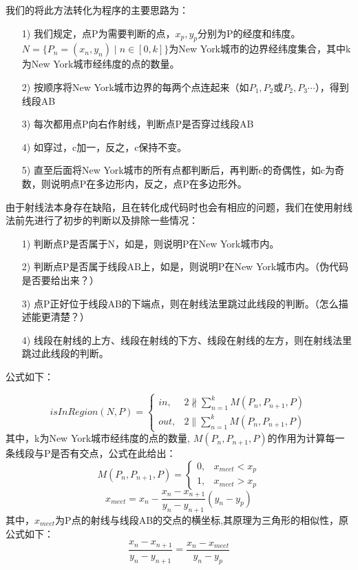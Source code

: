 我们的将此方法转化为程序的主要思路为：
\begin{itemize}
  \item [1)]
我们规定，点P为需要判断的点，$ x_p, y_p $分别为P的经度和纬度。$ N=\{P_n=(x_n,y_n)\mid n \in [0, k]\} $为New York城市的边界经纬度集合，其中k为New York城市经纬度的点的数量。

\item [2)]
按顺序将New York城市边界的每两个点连起来（如$ P_1, P_2 $或$ P_2, P_3 \cdots $），得到线段AB
\item [3)]
每次都用点P向右作射线，判断点P是否穿过线段AB
\item [4)]
如穿过，c加一，反之，c保持不变。
\item[5)]
直至后面将New York城市的所有点都判断后，再判断c的奇偶性，如c为奇数，则说明点P在多边形内，反之，点P在多边形外。
\end{itemize}
由于射线法本身存在缺陷，且在转化成代码时也会有相应的问题，我们在使用射线法前先进行了初步的判断以及排除一些情况：
\begin{itemize}
\item[1)]判断点P是否属于N，如是，则说明P在New York城市内。
\item[2)]判断点P是否属于线段AB上，如是，则说明P在New York城市内。（伪代码是否要给出来？）
\item[3)]点P正好位于线段AB的下端点，则在射线法里跳过此线段的判断。（怎么描述能更清楚？）
\item[4)]线段在射线的上方、线段在射线的下方、线段在射线的左方，则在射线法里跳过此线段的判断。


\end{itemize}
公式如下：

\[
isInRegion(N,P) = \begin{cases} in, & 2\nparallel \sum\limits_{n=1}^{k} M(P_n, P_{n+1},P)
 \\
out, & 2\parallel \sum\limits_{n=1}^{k} M(P_n, P_{n+1},P)
\end{cases}
\]
其中，k为New York城市经纬度的点的数量, $ M(P_n, P_{n+1},P) $的作用为计算每一条线段与P是否有交点，公式在此给出：
\[
M(P_n, P_{n+1},P) = \begin{cases}
0, & x_{meet}< x_p
 \\
1, & x_{meet}> x_p
\end{cases}
\]
\[
x_{meet} = x_n -\frac{x_n - x_{n+1}}{y_n - y_{n+1}}(y_n - y_p)
\]
其中，$ x_{meet} $为P点的射线与线段AB的交点的横坐标,其原理为三角形的相似性，原公式如下：
\[
\frac{x_n - x_{n+1}}{y_n - y_{n+1}}= \frac{x_n - x_{meet}}{y_n - y_p}
\]


